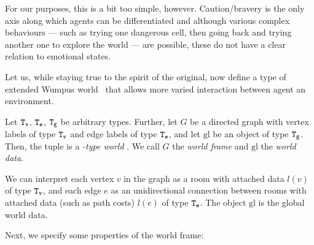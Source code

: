 For our purposes, this is a bit too simple, however. Caution/bravery is the only axis along which agents can be differentiated and although various complex behaviours --- such as trying one dangerous cell, then going back and trying another one to explore the world --- are possible, these do not have a clear relation to emotional states.

Let us, while staying true to the spirit of the original, now define a type of extended Wumpus world \wext\ that allows more varied interaction between agent an environment.

\begin{definition}\label{def:wext}
	Let $\mathtt{T_v}$, $\mathtt{T_e}$, $\mathtt{T_g}$ be arbitrary types. Further, let $G$ be a directed graph with vertex labels of type $\mathtt{T_v}$ and edge labels of type $\mathtt{T_e}$, and let $\mathrm{gl}$ be an object of type $\mathtt{T_g}$. Then, the tuple  is a \emph{\wext-type world} . We call $G$ the {\em world frame} and $\mathrm{gl}$ the {\em world data}.
\end{definition}

We can interpret each vertex $v$ in the graph as a room with attached data $l(v)$ of type $\mathtt{T_v}$, and each edge $e$ as an unidirectional connection between rooms with attached data (such as path costs) $l(e)$ of type $\mathtt{T_e}$. The object $\mathrm{gl}$ is the global world data.

Next, we specify some properties of the world frame:

